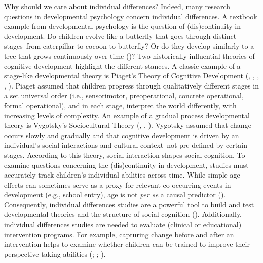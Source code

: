 \documentclass[
]{scrbook}
\begin{document}
Why should we care about individual differences? Indeed, many research questions in developmental psychology concern individual differences. A textbook example from developmental psychology is the question of (dis)continuity in development. Do children evolve like a butterfly that goes through distinct stages\thinspace --\thinspace from caterpillar to cocoon to butterfly? Or do they develop similarly to a tree that grows continuously over time ()? Two historically influential theories of cognitive development highlight the different stances. A classic example of a stage-like developmental theory is Piaget's Theory of Cognitive Development (, , , , ). Piaget assumed that children progress through qualitatively different stages in a set universal order (i.e., sensorimotor, preoperational, concrete operational, formal operational), and in each stage, interpret the world differently, with increasing levels of complexity. An example of a gradual process developmental theory is Vygotsky's Sociocultural Theory (, , ). Vygotsky assumed that change occurs slowly and gradually and that cognitive development is driven by an individual's social interactions and cultural context\thinspace --\thinspace not pre-defined by certain stages. According to this theory, social interaction shapes social cognition. To examine questions concerning the (dis)continuity in development, studies must accurately track children's individual abilities across time. While simple age effects can sometimes serve as a proxy for relevant co-occurring events in development (e.g., school entry), age is not \emph{per se} a causal predictor (). Consequently, individual differences studies are a powerful tool to build and test developmental theories and the structure of social cognition (). Additionally, individual differences studies are needed to evaluate (clinical or educational) intervention programs. For example, capturing change before and after an intervention helps to examine whether children can be trained to improve their perspective-taking abilities (; ; ).
\end{document}

